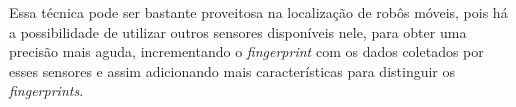       Essa técnica pode ser bastante proveitosa na localização de robôs móveis, pois há 
      a possibilidade de utilizar outros sensores disponíveis nele, para obter uma precisão
      mais aguda, incrementando o \textit{fingerprint} com os dados coletados por 
      esses sensores e assim adicionando mais características para distinguir os \textit{fingerprints}.
      

  
